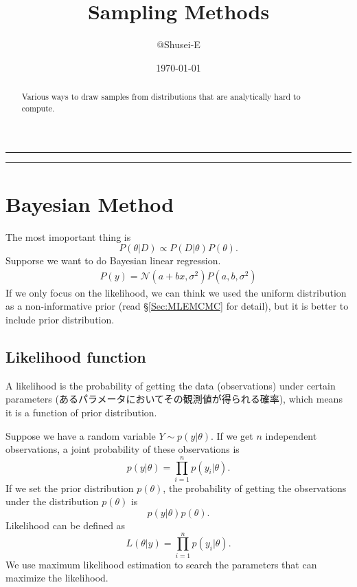 \documentclass[a4paper,10.5pt,uplatex]{jsarticle}  %
\begin{document}
\title{Sampling Methods}
\author{@Shusei-E}
\date{\today}
\maketitle
\begin{abstract}
Various ways to draw samples from distributions that are analytically hard to compute.
\end{abstract}

\noindent\rule{17.5cm}{1.7pt}
\vspace{-1.3cm}
\tableofcontents
\noindent\rule{17.5cm}{1.7pt}

\section{Bayesian Method}
The most imoportant thing is $$P(\theta|D) \propto P(D|\theta) P(\theta).$$ Supporse we want to do Bayesian linear regression.
\begin{align}
  P(y) = \mathcal{N}(a+bx, \sigma^2) P(a, b, \sigma^2)
\end{align}
If we only focus on the likelihood, we can think we used the uniform distribution as a non-informative prior (read \S\ref{Sec:MLEMCMC} for detail), but it is better to include prior distribution.


\subsection{Likelihood function}
A likelihood is the probability of getting the data (observations) under certain parameters (あるパラメータにおいてその観測値が得られる確率), which means it is a function of prior distribution.\par
Suppose we have a random variable $Y \sim p(y|\theta)$. If we get $n$ independent observations, a joint probability of these observations is $$p(y|\theta) = \prod_{i=1}^{n} p(y_i | \theta).$$ If we set the prior distribution $p(\theta)$, the probability of getting the observations under the distribution $p(\theta)$ is $$p(y|\theta)p(\theta).$$Likelihood can be defined as $$L(\theta|y) = \prod_{i=1}^{n} p(y_i|\theta).$$ We use maximum likelihood estimation to search the parameters that can maximize the likelihood.
\end{document}
